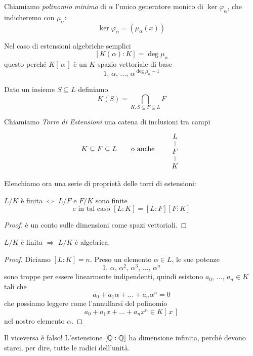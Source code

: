 \begin{multicols}{2}
\begin{definition}
	Chiamiamo \emph{polinomio minimo} di $ \alpha $ l'unico generatore monico di $ \ker\varphi_\alpha $, che indicheremo con $ \mu_\alpha $:
	\[ \ker\varphi_\alpha = (\mu_\alpha(x)) \]
\end{definition}

\begin{remark}
	Nel caso di estensioni algebriche semplici \[ [K(\alpha) : K ] = \deg \mu_\alpha \] questo perché $ K[\,\alpha\,] $ è un $ K $-spazio vettoriale di base $$  1,\, \alpha,\, \dots,\, \alpha^{\deg \mu_\alpha-1}  $$
\end{remark}

\begin{definition}
	Dato un insieme $ S \subseteq L $  definiamo
	\[ K(S) = \bigcap_{K, S \subseteq F \subseteq L} F  \]
\end{definition}

\begin{definition}
	Chiamiamo \emph{Torre di Estensioni} una catena di inclusioni tra campi
	\[ K \subseteq F \subseteq L \qquad\text{o anche}\qquad \begin{tikzcd}[row sep=0.25cm]
	L \arrow [d,-] \\
	F \arrow [d,-] \\
	K
	\end{tikzcd} \]
\end{definition}

Elenchiamo ora una serie di proprietà delle torri di estensioni:

\begin{prop}\label{1}
	$ L/K $ è finita $ \Leftrightarrow $ $ L/F $ e $ F/K $ sono finite
	\[ \text{e in tal caso } [L : K] = [L : F][F : K] \]
\end{prop}
\begin{proof}
	è un conto sulle dimensioni come spazi vettoriali.
\end{proof}

\begin{prop}\label{2}
	$ L/K $ è finita $ \Rightarrow $ $ L/K $ è algebrica.
\end{prop}
\begin{proof}
	Diciamo $ [L:K] = n $. Preso un elemento $ \alpha \in L $, le sue potenze
	\[ 1,\, \alpha,\, \alpha^2,\, \alpha^3 ,\,\dots,\, \alpha^n \]
	sono troppe per essere linearmente indipendenti, quindi esistono $ a_0,\, \dots,\, a_n \in K $ tali che
	\[ a_0 + a_1 \alpha + \dots + a_n \alpha^n = 0 \]
	che possiamo leggere come l'annullarsi del polinomio
	\[ a_0 + a_1 x + \dots + a_n x^n \in K[\,x\,] \]
	nel nostro elemento $ \alpha $.
\end{proof}
\begin{remark}
	Il viceversa è falso! L'estensione $ [\bar{\mathbb{Q}} : \mathbb{Q}] $ ha dimensione infinita, perché devono starci, per dire, tutte le radici dell'unità.
\end{remark}


\end{multicols}
